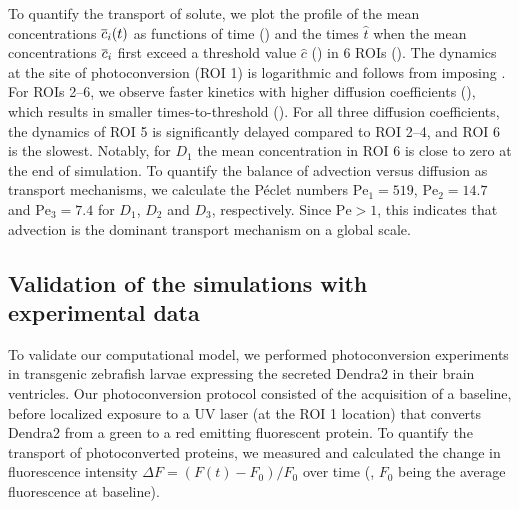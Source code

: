 \documentclass{WileyMSP-template}
\begin{document}
To quantify the transport of solute, we plot the profile of the mean
concentrations $\overline{c}_i(t)$ as functions of time
() and
the times $\hat{t}$ when the mean concentrations $\overline{c}_i$ first exceed
a threshold value $\hat{c}$ ()
in 6 ROIs ().
The dynamics at the site of photoconversion (ROI 1)
is logarithmic and follows from imposing .
For ROIs 2--6, we observe faster kinetics with higher diffusion coefficients
(),
which results in smaller times-to-threshold
().
For all three diffusion coefficients, the dynamics of ROI 5
is significantly delayed compared to ROI 2--4,
and ROI 6 is the slowest. Notably, for $D_1$ the mean concentration
in ROI 6 is close to zero at the end of simulation.
To quantify the balance of advection versus diffusion as transport mechanisms,
we calculate the Péclet numbers $\mathrm{Pe}_1=519$,
$\mathrm{Pe}_2=14.7$ and $\mathrm{Pe}_3=7.4$ for $D_1$, $D_2$ and $D_3$, respectively.
Since $\mathrm{Pe}>1$, this indicates that advection is the
dominant transport mechanism on a global scale.
 
\subsection{Validation of the simulations with experimental data}
To validate our computational model, we performed photoconversion experiments
in transgenic zebrafish larvae expressing the secreted Dendra2 in their brain ventricles.
Our photoconversion protocol consisted of the acquisition of a baseline,
before localized exposure to a UV laser (at the ROI 1 location)
that converts Dendra2 from a green to a red emitting fluorescent protein. 
To quantify the transport of photoconverted proteins, we measured and
calculated the change in fluorescence intensity $\Delta F = (F(t)-F_0)/F_0$
over time (,
$F_0$ being the average fluorescence at baseline). 
\end{document}
